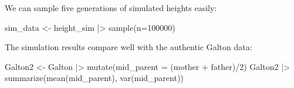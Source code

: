 \documentclass[
  letterpaper,
  DIV=11,
  numbers=noendperiod,
  oneside]{scrartcl}
\newenvironment{Shaded}{\begin{snugshade}}{\end{snugshade}}
\newcommand{\AttributeTok}[1]{\textcolor[rgb]{0.40,0.45,0.13}{#1}}
\newcommand{\DecValTok}[1]{\textcolor[rgb]{0.68,0.00,0.00}{#1}}
\newcommand{\FunctionTok}[1]{\textcolor[rgb]{0.28,0.35,0.67}{#1}}
\newcommand{\NormalTok}[1]{\textcolor[rgb]{0.00,0.23,0.31}{#1}}
\newcommand{\OtherTok}[1]{\textcolor[rgb]{0.00,0.23,0.31}{#1}}
\newcommand{\SpecialCharTok}[1]{\textcolor[rgb]{0.37,0.37,0.37}{#1}}
\begin{document}
\begin{marginfigure}


\caption{\label{fig-chain-of-heights}}

\end{marginfigure}%

We can sample five generations of simulated heights easily:

\begin{Shaded}
\begin{Highlighting}[]
\NormalTok{sim\_data }\OtherTok{\textless{}{-}}\NormalTok{ height\_sim }\SpecialCharTok{|\textgreater{}} \FunctionTok{sample}\NormalTok{(}\AttributeTok{n=}\DecValTok{100000}\NormalTok{)}
\end{Highlighting}
\end{Shaded}

The simulation results compare well with the authentic Galton data:

\begin{Shaded}
\begin{Highlighting}[]
\NormalTok{Galton2 }\OtherTok{\textless{}{-}}\NormalTok{ Galton }\SpecialCharTok{|\textgreater{}} \FunctionTok{mutate}\NormalTok{(}\AttributeTok{mid\_parent =}\NormalTok{ (mother }\SpecialCharTok{+}\NormalTok{ father)}\SpecialCharTok{/}\DecValTok{2}\NormalTok{)}
\NormalTok{Galton2 }\SpecialCharTok{|\textgreater{}} \FunctionTok{summarize}\NormalTok{(}\FunctionTok{mean}\NormalTok{(mid\_parent), }\FunctionTok{var}\NormalTok{(mid\_parent))}
\end{Highlighting}
\end{Shaded}
\end{document}

